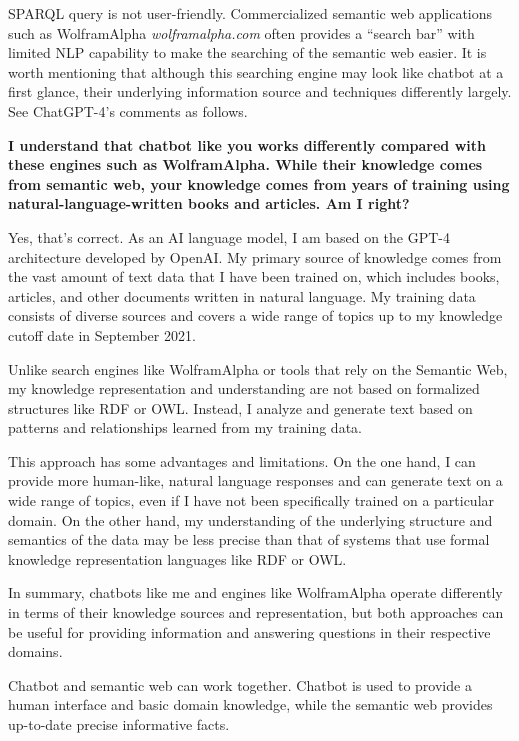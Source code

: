 SPARQL query is not user-friendly. Commercialized semantic web applications such as WolframAlpha \textit{wolframalpha.com} often provides a ``search bar'' with limited NLP capability to make the searching of the semantic web easier. It is worth mentioning that although this searching engine may look like chatbot at a first glance, their underlying information source and techniques differently largely. See ChatGPT-4's comments as follows.

\begin{mdframed}

\textbf{I understand that chatbot like you works differently compared with these engines such as WolframAlpha. While their knowledge comes from semantic web, your knowledge comes from years of training using natural-language-written books and articles. Am I right?}

Yes, that's correct. As an AI language model, I am based on the GPT-4 architecture developed by OpenAI. My primary source of knowledge comes from the vast amount of text data that I have been trained on, which includes books, articles, and other documents written in natural language. My training data consists of diverse sources and covers a wide range of topics up to my knowledge cutoff date in September 2021.

Unlike search engines like WolframAlpha or tools that rely on the Semantic Web, my knowledge representation and understanding are not based on formalized structures like RDF or OWL. Instead, I analyze and generate text based on patterns and relationships learned from my training data.

This approach has some advantages and limitations. On the one hand, I can provide more human-like, natural language responses and can generate text on a wide range of topics, even if I have not been specifically trained on a particular domain. On the other hand, my understanding of the underlying structure and semantics of the data may be less precise than that of systems that use formal knowledge representation languages like RDF or OWL.

In summary, chatbots like me and engines like WolframAlpha operate differently in terms of their knowledge sources and representation, but both approaches can be useful for providing information and answering questions in their respective domains.
\end{mdframed} 

Chatbot and semantic web can work together. Chatbot is used to provide a human interface and basic domain knowledge, while the semantic web provides up-to-date precise informative facts.

